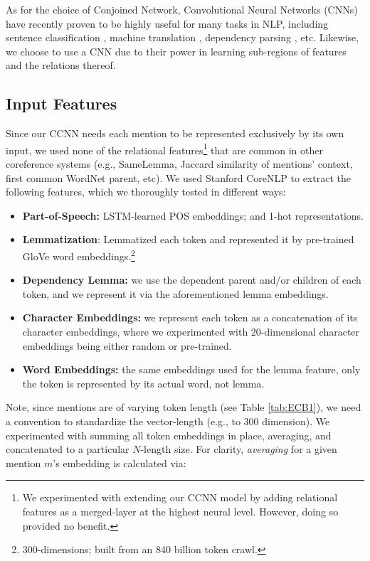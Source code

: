 \documentclass[11pt,a4paper]{article}
\begin{document}
As for the choice of Conjoined Network, Convolutional Neural Networks (CNNs) have recently proven to be highly useful for many tasks in NLP, including sentence classification \cite{DBLP:conf/emnlp/Kim14}, machine translation \cite{DBLP:conf/acl/GehringAGD17}, dependency parsing \cite{DBLP:journals/corr/YuV17}, etc.  Likewise, we choose to use a CNN due to their power in learning sub-regions of features and the relations thereof.

\subsection{Input Features}
\label{sec:features}
Since our CCNN needs each mention to be represented exclusively by its own input, we used none of the relational features\footnote{We experimented with extending our CCNN model by adding relational features as a merged-layer at the highest neural level.  However, doing so provided no benefit.} that are common in other coreference systems (e.g., SameLemma, Jaccard similarity of mentions' context, first common WordNet parent, etc).  We used Stanford CoreNLP \cite{manning-EtAl:2014:P14-5} to extract the following features, which we thoroughly tested in different ways:
\begin{itemize}
  \item \textbf{Part-of-Speech:} LSTM-learned POS embeddings; and 1-hot representations.
  \item \textbf{Lemmatization}: Lemmatized each token and represented it by pre-trained GloVe \cite{pennington2014glove} word embeddings.\footnote{300-dimensions; built from an 840 billion token crawl.}
  \item \textbf{Dependency Lemma:} we use the dependent parent and/or children of each token, and we represent it via the aforementioned lemma embeddings.
  \item \textbf{Character Embeddings:} we represent each token as a concatenation of its character embeddings, where we experimented with 20-dimensional character embeddings being either random or pre-trained.
  \item \textbf{Word Embeddings:} the same embeddings used for the lemma feature, only the token is represented by its actual word, not lemma.
\end{itemize}
Note, since mentions are of varying token length (see Table \ref{tab:ECB1}), we need a convention to standardize the vector-length (e.g., to 300 dimension).  We experimented with summing all token embeddings in place, averaging, and concatenated to a particular $N$-length size.  For clarity, \textit{averaging} for a given mention $m$'s embedding is calculated via:
\end{document}
